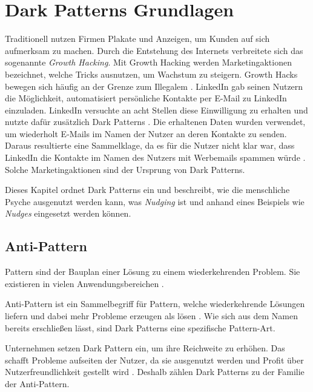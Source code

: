\documentclass[conference,compsoc,final,a4paper]{IEEEtran}
\begin{document}
\section{Dark Patterns Grundlagen}
\label{chap:Grundlagen}

Traditionell nutzen Firmen Plakate und Anzeigen, um Kunden auf sich aufmerksam zu machen. Durch die Entstehung des Internets verbreitete sich das sogenannte \textit{Growth Hacking}. Mit Growth Hacking werden Marketingaktionen bezeichnet, welche Tricks ausnutzen, um Wachstum zu steigern. Growth Hacks bewegen sich häufig an der Grenze zum Illegalem \autocite{Narayanan2020}. LinkedIn gab seinen Nutzern die Möglichkeit, automatisiert persönliche Kontakte per E-Mail zu LinkedIn einzuladen. LinkedIn versuchte an acht Stellen diese Einwilligung zu erhalten und nutzte dafür zusätzlich Dark Patterns \autocite{Schlosser2015}. Die erhaltenen Daten wurden verwendet, um wiederholt E-Mails im Namen der Nutzer an deren Kontakte zu senden. Daraus resultierte eine Sammelklage, da es für die Nutzer nicht klar war, dass LinkedIn die Kontakte im Namen des Nutzers mit Werbemails spammen würde \autocite{Strange2015}. Solche Marketingaktionen sind der Ursprung von Dark Patterns.

Dieses Kapitel ordnet Dark Patterns ein und beschreibt, wie die menschliche Psyche ausgenutzt werden kann, was \textit{Nudging} ist und anhand eines Beispiels wie \textit{Nudges} eingesetzt werden können.
\subsection{Anti-Pattern}
Pattern sind der Bauplan einer Lösung zu einem wiederkehrenden Problem. Sie existieren in vielen Anwendungsbereichen \autocite[S. 1]{MacDonald2019}.

Anti-Pattern ist ein Sammelbegriff für Pattern, welche wiederkehrende Lösungen liefern und dabei mehr Probleme erzeugen als lösen \autocite[S. 193-195]{MacDonald2019}. Wie sich aus dem Namen bereits erschließen lässt, sind Dark Patterns eine spezifische Pattern-Art.

Unternehmen setzen Dark Pattern ein, um ihre Reichweite zu erhöhen. Das schafft Probleme aufseiten der Nutzer, da sie ausgenutzt werden und Profit über Nutzerfreundlichkeit gestellt wird \autocite{Chivukula_2019}. Deshalb zählen Dark Patterns zu der Familie der Anti-Pattern.
\end{document}
